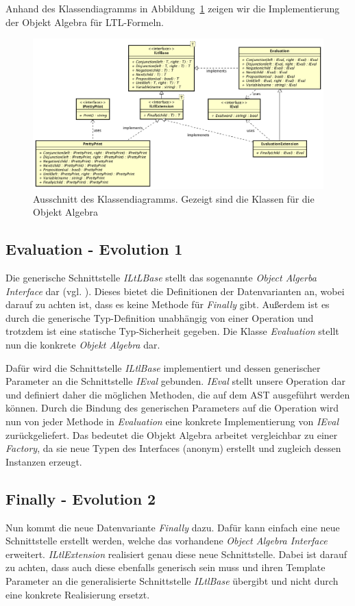 \documentclass{llncs}
\begin{document}
Anhand des Klassendiagramms in Abbildung~\ref{fig:object-algebra} zeigen wir die Implementierung der Objekt Algebra für LTL-Formeln.

\begin{figure}
	\centering
	\includegraphics[width=\textwidth]{images/ObjectAlgebra.png}
	\caption{Ausschnitt des Klassendiagramms. Gezeigt sind die Klassen für die Objekt Algebra}
	\label{fig:object-algebra}
\end{figure}

\subsection{Evaluation - Evolution 1}
Die generische Schnittstelle \emph{ILtLBase} stellt das sogenannte \emph{Object Algerba Interface} dar (vgl. \cite[Abschnitt 3 S.6]{Oliveira12}).
Dieses bietet die Definitionen der Datenvarianten an, wobei darauf zu achten ist, dass es keine Methode für \emph{Finally} gibt.
Außerdem ist es durch die generische Typ-Definition unabhängig von einer Operation und trotzdem ist eine statische Typ-Sicherheit gegeben.
Die Klasse \emph{Evaluation} stellt nun die konkrete \emph{Objekt Algebra} dar.

Dafür wird die Schnittstelle \emph{ILtlBase} implementiert und dessen generischer Parameter an die Schnittstelle \emph{IEval} gebunden.
\emph{IEval} stellt unsere Operation dar und definiert daher die möglichen Methoden, die auf dem AST ausgeführt werden können.
Durch die Bindung des generischen Parameters auf die Operation wird nun von jeder Methode in \emph{Evaluation} eine konkrete Implementierung von \emph{IEval} zurückgeliefert.
Das bedeutet die Objekt Algebra arbeitet vergleichbar zu einer \emph{Factory}, da sie neue Typen des Interfaces (anonym) erstellt und zugleich dessen Instanzen erzeugt.

\subsection{Finally - Evolution 2}
Nun kommt die neue Datenvariante \emph{Finally} dazu. Dafür kann einfach eine neue Schnittstelle erstellt werden, welche das vorhandene \emph{Object Algebra Interface} erweitert.
\emph{ILtlExtension} realisiert genau diese neue Schnittstelle. Dabei ist darauf zu achten,
dass auch diese ebenfalls generisch sein muss und ihren Template Parameter an die generalisierte Schnittstelle \emph{ILtlBase} übergibt und nicht durch eine konkrete Realisierung ersetzt.
\end{document}
